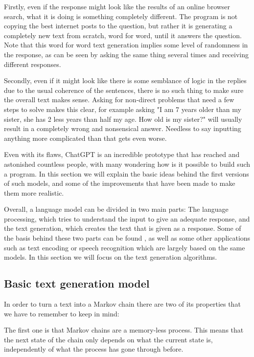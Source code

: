 \documentclass[12pt]{article}
\numberwithin{equation}{section}
\begin{document}
Firstly, even if the response might look like the results of an online browser search, what it is doing is something completely different. The program is not copying the best internet posts to the question, but rather it is generating a completely new text from scratch, word for word, until it answers the question. Note that this word for word text generation implies some level of randomness in the response, as can be seen by asking the same thing several times and receiving different responses.

Secondly, even if it might look like there is some semblance of logic in the replies due to the usual coherence of the sentences, there is no such thing to make sure the overall text makes sense. Asking for non-direct problems that need a few steps to solve makes this clear, for example asking "I am 7 years older than my sister, she has 2 less years than half my age. How old is my sister?" will usually result in a completely wrong and nonsensical answer. Needless to say inputting anything more complicated than that gets even worse.

\bigskip

Even with its flaws, ChatGPT is an incredible prototype that has reached and astonished countless people, with many wondering how is it possible to build such a program. In this section we will explain the basic ideas behind the first versions of such models, and some of the improvements that have been made to make them more realistic.

Overall, a language model can be divided in two main parts: The language processing, which tries to understand the input to give an adequate response, and the text generation, which creates the text that is given as a response. Some of the basis behind these two parts can be found \cite{jelinek1985markov}, as well as some other applications such as text encoding or speech recognition which are largely based on the same models. In this section we will focus on the text generation algorithms.


\subsection{Basic text generation model}

In order to turn a text into a Markov chain there are two of its properties that we have to remember to keep in mind:

The first one is that Markov chains are a memory-less process. This means that the next state of the chain only depends on what the current state is, independently of what the process has gone through before.
\end{document}
